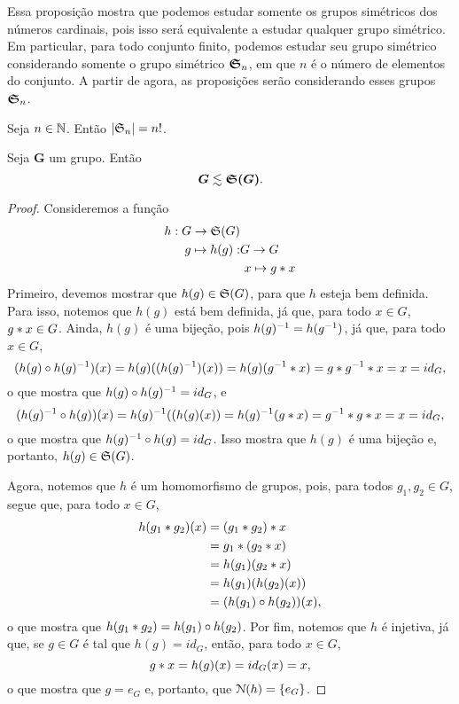 	Essa proposição mostra que podemos estudar somente os grupos simétricos dos números cardinais, pois isso será equivalente a estudar qualquer grupo simétrico. Em particular, para todo conjunto finito, podemos estudar seu grupo simétrico considerando somente o grupo simétrico $\bm{\mathfrak{S}}_n$, em que $n$ é o número de elementos do conjunto. A partir de agora, as proposições serão considerando esses grupos $\bm{\mathfrak{S}}_n$.

\begin{prop}
	Seja $n \in \mathbb{N}$. Então $|\mathfrak{S}_n|=n!$.
\end{prop}

\begin{teo}
	Seja $\bm G$ um grupo. Então
	\begin{equation*}
	\bm G \lesssim \bm{\mathfrak{S}(G)}.
	\end{equation*}
\end{teo}
\begin{proof}
	Consideremos a função
	\begin{align*}
	h: G \to \mathfrak{S}(G) & \\
		g \mapsto h(g): & G \to G \\
									&\ x \mapsto g \ast x \\
	\end{align*}
Primeiro, devemos mostrar que $h(g) \in \mathfrak{S}(G)$, para que $h$ esteja bem definida. Para isso, notemos que $h(g)$ está bem definida, já que, para todo $x \in G$, $g \ast x \in G$. Ainda, $h(g)$ é uma bijeção, pois $h(g)^{-1} = h(g^{-1})$, já que, para todo $x \in G$,
	\begin{equation*}
	(h(g) \circ h(g)^{-1})(x) = h(g)((h(g)^{-1})(x)) = h(g)(g^{-1} \ast x) = g \ast g^{-1} \ast x = x =id_G,
	\end{equation*}
o que mostra que $h(g) \circ h(g)^{-1} = id_G$, e
	\begin{equation*}
	(h(g)^{-1} \circ h(g))(x) = h(g)^{-1}((h(g)(x)) = h(g)^{-1}(g \ast x) = g^{-1} \ast g \ast x = x =id_G,
	\end{equation*}
o que mostra que $h(g)^{-1} \circ h(g) = id_G$. Isso mostra que $h(g)$ é uma bijeção e, portanto, $h(g) \in \mathfrak{S}(G)$.

	Agora, notemos que $h$ é um homomorfismo de grupos, pois, para todos $g_1,g_2 \in G$, segue que, para todo $x \in G$,
	\begin{align*}
	h(g_1 \ast g_2)(x) &= (g_1 \ast g_2) \ast x \\
	&= g_1 \ast (g_2 \ast x) \\
	&= h(g_1)(g_2 \ast x) \\
	&= h(g_1)(h(g_2)(x)) \\
	&= (h(g_1) \circ h(g_2))(x),
	\end{align*}
o que mostra que $h(g_1 \ast g_2) = h(g_1) \circ h(g_2)$. Por fim, notemos que $h$ é injetiva, já que, se $g \in G$ é tal que $h(g)=id_G$, então, para todo $x \in G$,
	\begin{equation*}
	g \ast x = h(g)(x) = id_G(x) = x,
	\end{equation*}
o que mostra que $g=e_G$ e, portanto, que $\mathcal{N}(h)=\{e_G\}$.
\end{proof}


